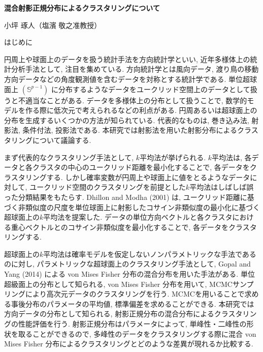 \documentclass[a4j,11pt]{jarticle}
\makeatletter
\def\section{\@startsection{section}{1}{\z@}
   {0.8\Cvs \@plus.5\Cdp \@minus.2\Cdp}
   {0.2\Cvs \@plus.3\Cdp}
   {\normalfont \Large \bfseries}}
\makeatother
\begin{document}

\begin{center}
{\Large \textbf{混合射影正規分布によるクラスタリングについて}}
\end{center}
\begin{flushright}
小坪 琢人（塩濱 敬之准教授）
\end{flushright}
\vspace{-3zh}


\section{はじめに}

円周上や球面上のデータを扱う統計手法を方向統計学といい, 近年多様体上の統計分析手法として, 注目を集めている. 方向統計学とは風向データ, 渡り鳥の移動方向データなどの角度観測値を含むデータを対称とする統計学である. 単位超球面上 $(\mathbb{S}^{p-1})$ に分布するようなデータをユークリッド空間上のデータとして扱うと不適当なことがある. データを多様体上の分布として扱うことで, 数学的モデルを作る際に低次元で考えられるなどの利点がある. 円周あるいは超球面上の分布を生成するいくつかの方法が知られている. 代表的なものは, 巻き込み法, 射影法, 条件付法, 投影法である. 本研究では射影法を用いた射影分布によるクラスタリングについて議論する.

まず代表的なクラスタリング手法として, $k$平均法が挙げられる. $k$平均法は, 各データと各クラスタの中心のユークリッド距離を最小化することで, 各データをクラスタリングする. しかし確率変数が円周上や球面上に値をとるようなデータに対して, ユークリッド空間のクラスタリングを前提とした$k$平均法はしばしば誤った分類結果をもたらす. Dhillon and Modha (2001) は, ユークリッド距離に基づく非類似度の尺度を単位球面上に射影したコサイン非類似度の最小化に基づく超球面上の$k$平均法を提案した. データの単位方向ベクトルと各クラスタにおける重心ベクトルとのコサイン非類似度を最小化することで, 各データをクラスタリングする. 

超球面上の$k$平均法は確率モデルを仮定しないノンパラメトリックな手法であるのに対し,  パラメトリックな超球面上のクラスタリング手法として, Gopal and Yang (2014) による von Mises Fisher 分布の混合分布を用いた手法がある. 単位超級面上の分布として知られる, von Mises Fisher 分布を用いて, MCMCサンプリングにより高次元データのクラスタリングを行う. MCMCを用いることで求める事後分布のパラメータの平均値, 標準偏差を求めることができる. 本研究では方向データの分布として知られる, 射影正規分布の混合分布によるクラスタリングの性能評価を行う. %
射影正規分布はパラメータによって, 単峰性・二峰性の形状を取ることができるので, 多峰性のデータをクラスタリングする際に混合 von Mises Fisher 分布によるクラスタリングとどのような差異が現れるか比較する.
\end{document}
